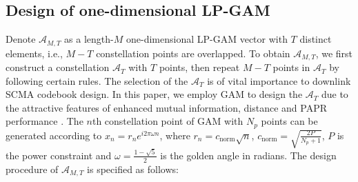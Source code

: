 \documentclass[journal]{IEEEtran}
\begin{document}
 

\subsection{Design of  one-dimensional LP-GAM}
Denote  $\mathcal A _{{M,T}}$ as a length-$M$  one-dimensional LP-GAM vector with  $T$  distinct elements, i.e.,   $M-T$ constellation points are overlapped. To obtain  $\mathcal A _{{M,T}}$, we first construct a constellation $\mathcal{A}_T$ with $T$ points, then repeat $M-T$ points in $\mathcal{A}_T$ by following certain rules.  
The selection  of the  $\mathcal A _{T}$ is of vital importance to    downlink SCMA codebook design. %
In this paper, we employ  GAM to design the $\mathcal A _{T}$ due to the attractive features of enhanced mutual information, distance and  PAPR performance \cite{larsson2017golden}.    The $n$th constellation point of GAM with $N_{p}$ points can be   generated according to $x_n = r_ne^{i2\pi \omega n}$, where $r_n = c_{\text {norm}}\sqrt{n}$, $c_{\text {norm}} = \scriptstyle\sqrt{\frac{2P}{N_p+1}}$,  $P$ is the  power constraint and $\omega = \frac{1-\sqrt{5}}{2}$ is the golden angle in radians.   %
   The design  procedure of $\mathcal A _{{M,T}}$ is specified as follows:

\end{document}
